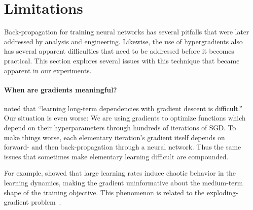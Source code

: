 \documentclass{article}
\newcommand{\primal}{elementary}
\begin{document}
\section{Limitations}

Back-propagation for training neural networks has several pitfalls that were later addressed by analysis and engineering.
Likewise, the use of hypergradients also has several apparent difficulties that need to be addressed before it becomes practical.
This section explores several issues with this technique that became apparent in our experiments.

\paragraph{When are gradients meaningful?}
\citet{bengio1994learning} noted that ``learning long-term dependencies with gradient descent is difficult.''
Our situation is even worse: We are using gradients to optimize functions which depend on their hyperparameters through hundreds of iterations of SGD.
To make things worse, each \primal{} iteration's gradient itself depends on forward- and then back-propagation through a neural network.
Thus the same issues that sometimes make \primal{} learning difficult are compounded.


For example, \citet*[Chapter 4]{pearlmutter1996investigation} showed that 
large learning rates induce chaotic behavior in the learning dynamics,
making the gradient uninformative about the medium-term shape of the training objective.
This phenomenon is related to the exploding-gradient problem~\cite{pascanu2012understanding}.
\end{document}
